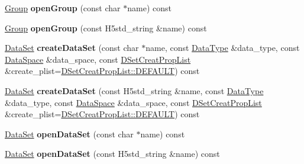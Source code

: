 \begin{DoxyCompactItemize}
\item 
\mbox{\label{class_h5_1_1_h5_location_a7485182fdaf3d859c47bc605e71b809d}} 
\hyperlink{class_h5_1_1_group}{Group} {\bfseries open\+Group} (const char $\ast$name) const
\item 
\mbox{\label{class_h5_1_1_h5_location_a11d21ae5cb8573474e8d25edd787c623}} 
\hyperlink{class_h5_1_1_group}{Group} {\bfseries open\+Group} (const H5std\+\_\+string \&name) const
\item 
\mbox{\label{class_h5_1_1_h5_location_a07b236b42f5cf008e516df6cc241cd22}} 
\hyperlink{class_h5_1_1_data_set}{Data\+Set} {\bfseries create\+Data\+Set} (const char $\ast$name, const \hyperlink{class_h5_1_1_data_type}{Data\+Type} \&data\+\_\+type, const \hyperlink{class_h5_1_1_data_space}{Data\+Space} \&data\+\_\+space, const \hyperlink{class_h5_1_1_d_set_creat_prop_list}{D\+Set\+Creat\+Prop\+List} \&create\+\_\+plist=\hyperlink{class_h5_1_1_d_set_creat_prop_list_aea0be1dc39378736daeac7af787bbc8e}{D\+Set\+Creat\+Prop\+List\+::\+D\+E\+F\+A\+U\+LT}) const
\item 
\mbox{\label{class_h5_1_1_h5_location_abda4ad5d97a0cfff2779a2b4a81096db}} 
\hyperlink{class_h5_1_1_data_set}{Data\+Set} {\bfseries create\+Data\+Set} (const H5std\+\_\+string \&name, const \hyperlink{class_h5_1_1_data_type}{Data\+Type} \&data\+\_\+type, const \hyperlink{class_h5_1_1_data_space}{Data\+Space} \&data\+\_\+space, const \hyperlink{class_h5_1_1_d_set_creat_prop_list}{D\+Set\+Creat\+Prop\+List} \&create\+\_\+plist=\hyperlink{class_h5_1_1_d_set_creat_prop_list_aea0be1dc39378736daeac7af787bbc8e}{D\+Set\+Creat\+Prop\+List\+::\+D\+E\+F\+A\+U\+LT}) const
\item 
\mbox{\label{class_h5_1_1_h5_location_a1d2fc7476ad72c6a46ebe6e3e15bb1f4}} 
\hyperlink{class_h5_1_1_data_set}{Data\+Set} {\bfseries open\+Data\+Set} (const char $\ast$name) const
\item 
\mbox{\label{class_h5_1_1_h5_location_a1cb173807c0ce023a474c78cecf7dfc1}} 
\hyperlink{class_h5_1_1_data_set}{Data\+Set} {\bfseries open\+Data\+Set} (const H5std\+\_\+string \&name) const
\item 
\mbox{\label{class_h5_1_1_h5_location_a1b51a660dae019dbffa909cb44a127ca}} 

\end{DoxyCompactItemize}
